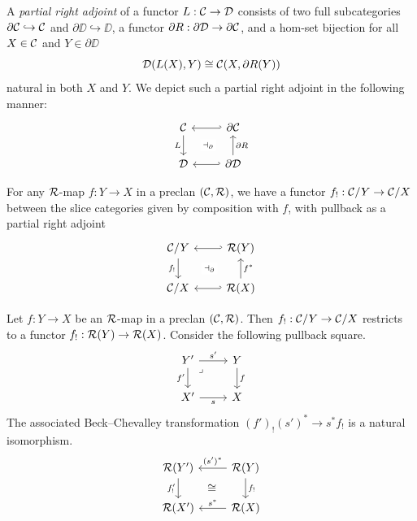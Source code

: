 \begin{definition}\label{def:partial-right-adjoint}
  A \emph{partial right adjoint} of a functor $L : \mathcal{C} \to \mathcal{D}$
  consists of two full subcategories
  $\partial\mathcal{C} \hookrightarrow \mathcal{C}$
  and $\partial\DD \hookrightarrow \DD$,
  a functor $\partial R : \partial \mathcal{D} \to \partial \mathcal{C}$,
  and a hom-set bijection for all
  $X \in \mathcal{C}$ and $Y \in \partial\DD$
  \[ \mathcal{D}(L (X), Y) \cong \mathcal{C}(X,\partial R (Y))\]
  natural in both $X$ and $Y$.
  We depict such a partial right adjoint in the following manner:
  \[\begin{tikzcd}
	\CC & {\partial\CC} \\
	\DD & {\partial \DD}
	\arrow[""{name=0, anchor=center, inner sep=0}, "L"', from=1-1, to=2-1]
	\arrow[hook', from=1-2, to=1-1]
	\arrow[""{name=1, anchor=center, inner sep=0}, "{\partial R}"', from=2-2, to=1-2]
	\arrow[hook', from=2-2, to=2-1]
	\arrow["{\dashv_\partial}"{description}, draw=none, from=0, to=1]
  \end{tikzcd}\]
\end{definition}

For any $\mathcal{R}$-map $f : Y \to X$ in a preclan $(\mathcal{C},\mathcal{R})$,
we have a functor $f_! : \mathcal{C} / Y \to \mathcal{C} / X$
between the slice categories given by composition with $f$,
with pullback as a partial right adjoint
\[\begin{tikzcd}
{\CC / Y} & {\RR(Y)} \\
{\CC / X} & {\RR(X)}
\arrow[""{name=0, anchor=center, inner sep=0}, "{f_!}"', from=1-1, to=2-1]
\arrow[hook', from=1-2, to=1-1]
\arrow[""{name=1, anchor=center, inner sep=0}, "{f^*}"', from=2-2, to=1-2]
\arrow[hook', from=2-2, to=2-1]
\arrow["{\dashv_\partial}"{description}, draw=none, from=0, to=1]
\end{tikzcd}\]

\begin{proposition}\label{prop:beck-chevalley-left}
  Let $f : Y \to X$ be an $\mathcal{R}$-map in a preclan $(\mathcal{C},\mathcal{R})$.
  Then $f_! : \mathcal{C} / Y \to \mathcal{C} / X$ restricts to a functor
  $f_! : \mathcal{R}(Y) \to \mathcal{R}(X)$.
  Consider the following pullback square.
  \[
  \begin{tikzcd}
    {Y'} & Y \\
    {X'} & X
    \arrow["{s'}", from=1-1, to=1-2]
    \arrow["{f'}"', from=1-1, to=2-1]
    \arrow["\lrcorner"{anchor=center, pos=0.125}, draw=none, from=1-1, to=2-2]
    \arrow["f", from=1-2, to=2-2]
    \arrow["s"', from=2-1, to=2-2]
  \end{tikzcd}
  \]
  The associated Beck--Chevalley transformation
  $(f')_! (s')^* \to s^* f_!$ is a natural isomorphism.
  \[
  \begin{tikzcd}
    \RR(Y') \ar[d, "f'_!"'] \ar[dr, phantom, "\cong"]  &
    \RR(Y) \ar[l, "(s')^*"'] \ar[d, "f_!"] \\
    \RR(X') & \RR(X) \ar[l, "s^*"']
  \end{tikzcd}
  \]
\end{proposition}

